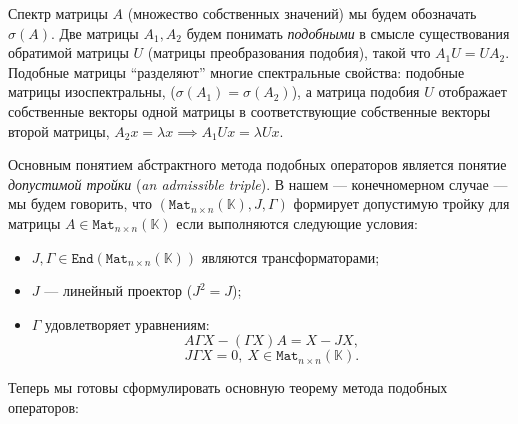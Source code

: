 \documentclass[14pt,a4paper]{extarticle}
\numberwithin{equation}{section}
\theoremstyle{definition}
\begin{document}
Спектр матрицы \( A \)
    (множество собственных значений)
    мы будем обозначать \( \sigma(A) \).
Две матрицы \( A_1, A_2 \) будем понимать \emph{подобными}
    в смысле существования обратимой матрицы \( U \)
    (матрицы преобразования подобия),
    такой что \( A_1 U = U A_2 \).
Подобные матрицы ``разделяют'' многие спектральные свойства:
    подобные матрицы изоспектральны, (\( \sigma(A_1) = \sigma(A_2) \)),
    а матрица подобия \( U \) отображает собственные векторы одной матрицы
    в соответствующие собственные векторы второй матрицы,
    \( A_2 x = \lambda x \implies A_1 U x = \lambda U x \).

Основным понятием абстрактного метода подобных операторов
явл\-яется понятие \emph{допустимой тройки} (\emph{an admissible triple}).
В нашем --- конечно\-мерном случае --- мы будем говорить, что
    \( (\mathtt{Mat}_{n{\times}n}(\mathbb{K}), J, \Gamma) \)
    формирует допустимую тройку
    для матрицы \( A\in\mathtt{Mat}_{n{\times}n}(\mathbb{K}) \)
    если вы\-полняются следующие условия:
\begin{itemize}
    \item \( J, \Gamma \in \mathtt{End}(\mathtt{Mat}_{n{\times}n}(\mathbb{K})) \)
      являются транс\-форм\-аторами;
    \item \( J \) --- линейный проектор (\( J^2 = J \));
    \item  \( \Gamma \) удовле\-творяет уравнениям:
        \[
            A \Gamma X - (\Gamma X) A = X - JX,
        \]
        \[
            J\Gamma X = 0,\ X\in\mathtt{Mat}_{n{\times}n}(\mathbb{K}).
        \]
\end{itemize}

Теперь мы готовы сформулировать основную теорему метода подобных операторов:
\end{document}
